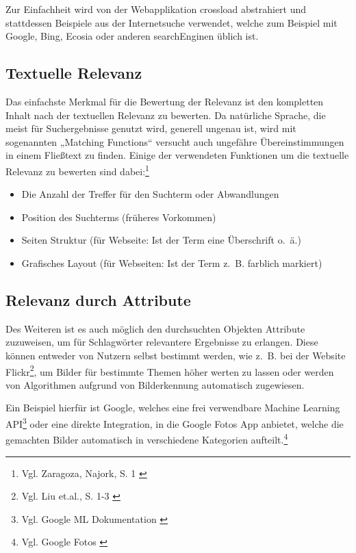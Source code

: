 Zur Einfachheit wird von der Webapplikation \gls{crossload} abstrahiert und stattdessen Beispiele aus der Internetsuche verwendet, welche zum Beispiel mit Google, Bing, Ecosia oder anderen \gls{searchEngine}n üblich ist.

\subsection{Textuelle Relevanz}
\label{sub:relevanceText}
Das einfachste Merkmal für die Bewertung der Relevanz ist den kompletten Inhalt nach der textuellen Relevanz zu bewerten.
Da natürliche Sprache, die meist für Suchergebnisse genutzt wird, generell ungenau ist, wird mit sogenannten „Matching Functions“ versucht auch ungefähre Übereinstimmungen in einem Fließtext zu finden.
Einige der verwendeten Funktionen um die textuelle Relevanz zu bewerten sind dabei:\footnote{Vgl. Zaragoza, Najork, S. 1 \cite{zaragoza2018}}

\begin{itemize}
  \item Die Anzahl der Treffer für den Suchterm oder Abwandlungen
  \item Position des Suchterms (früheres Vorkommen)
  \item Seiten Struktur (für Webseite: Ist der Term eine Überschrift o. ä.)
  \item Grafisches Layout (für Webseiten: Ist der Term z. B. farblich markiert)
\end{itemize}
\subsection{Relevanz durch Attribute}
\label{sub:relevanceAttribute}
Des Weiteren ist es auch möglich den durchsuchten Objekten Attribute zuzuweisen, um für Schlagwörter relevantere Ergebnisse zu erlangen.
Diese können entweder von Nutzern selbst bestimmt werden, wie z. B. bei der Website Flickr\footnote{Vgl. Liu et.al., S. 1-3 \cite{liu2009}}, um Bilder für bestimmte Themen höher werten zu lassen oder werden von Algorithmen aufgrund von Bilderkennung automatisch zugewiesen.

Ein Beispiel hierfür ist Google, welches eine frei verwendbare Machine Learning API\footnote{Vgl. Google ML Dokumentation \cite{googledevelopers2022}} oder eine direkte Integration, in die Google Fotos App anbietet, welche die gemachten Bilder automatisch in verschiedene Kategorien aufteilt.\footnote{Vgl. Google Fotos \cite{googlephotos2022}}


